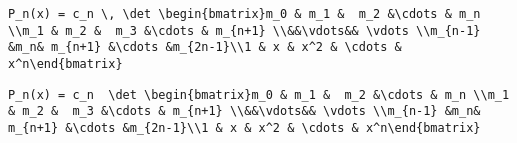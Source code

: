\newsavebox\DBMA
\begin{lrbox}{\DBMA}
 \begin{minipage}[t]{0.82\textwidth}
  \lstinline[language={[latex]TeX},mathescape,breaklines=true]""
 \end{minipage}
\end{lrbox}
\newsavebox\DCT
\begin{lrbox}{\DCT}
 \begin{minipage}[t]{0.82\textwidth}
  \lstinline[language={[latex]TeX},mathescape,breaklines=true]"P_n(x) = c_n \, \det \begin{bmatrix}m_0 & m_1 &  m_2 &\cdots & m_n \\m_1 & m_2 &  m_3 &\cdots & m_{n+1} \\&&\vdots&& \vdots \\m_{n-1} &m_n& m_{n+1} &\cdots &m_{2n-1}\\1 & x & x^2 & \cdots & x^n\end{bmatrix}"
 \end{minipage}
\end{lrbox}
\newsavebox\DCST
\begin{lrbox}{\DCST}
 \begin{minipage}[t]{0.82\textwidth}
  \lstinline[language={[latex]TeX},mathescape,breaklines=true]"P_n(x) = c_n  \det \begin{bmatrix}m_0 & m_1 &  m_2 &\cdots & m_n \\m_1 & m_2 &  m_3 &\cdots & m_{n+1} \\&&\vdots&& \vdots \\m_{n-1} &m_n& m_{n+1} &\cdots &m_{2n-1}\\1 & x & x^2 & \cdots & x^n\end{bmatrix}"
 \end{minipage}
\end{lrbox}
\newsavebox\DCMM
\begin{lrbox}{\DCMM}
 \begin{minipage}[t]{0.82\textwidth}
  \lstinline[language={[latex]TeX},mathescape,breaklines=true]""
 \end{minipage}
\end{lrbox}
\newsavebox\DCMA
\begin{lrbox}{\DCMA}
 \begin{minipage}[t]{0.82\textwidth}
  \lstinline[language={[latex]TeX},mathescape,breaklines=true]""
 \end{minipage}
\end{lrbox}
